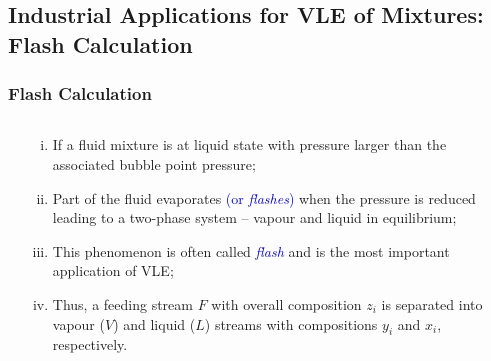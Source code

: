 \documentclass[10pt,compress,unknownkeysallowed]{beamer}
\begin{document}
\subsection{Industrial Applications for VLE of Mixtures: Flash Calculation}

\begin{frame}
  \frametitle{Flash Calculation}
  \begin{columns}
     \begin{column}[c]{0.5\linewidth}
     \end{column}
     \begin{column}[l]{0.5\linewidth}
        \begin{enumerate}[i)]
           \item<1-> If a fluid mixture is at liquid state with pressure larger than the associated bubble point pressure; %
           \item<2-> Part of the fluid evaporates \textcolor{blue}{(or {\it flashes})} when the pressure is reduced leading to a two-phase system -- vapour and liquid in equilibrium;
            \item<3-> This phenomenon is often called \textcolor{blue}{\it flash} and is the most important application of VLE;
            \item<4-> Thus, a feeding stream $F$ with overall composition $z_{i}$ is separated into vapour ($V$) and liquid ($L$) streams with compositions $y_{i}$ and $x_{i}$, respectively. 
        \end{enumerate}
     \end{column}
   \end{columns}
\end{frame}
\end{document}
